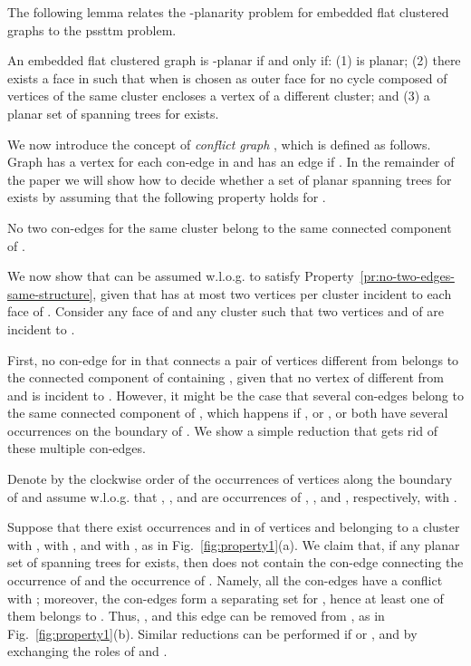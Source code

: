 \documentclass[letter,runningheads]{llncs}
\begin{document}
The following lemma relates the -planarity problem for embedded flat clustered graphs to the {\sc pssttm} problem.

\begin{lemma} \label{le:acyclic-saturator}
An embedded flat clustered graph  is -planar if and only if: (1)  is planar; (2) there exists a face  in  such that when  is chosen as outer face for  no cycle composed of vertices of the same cluster encloses a vertex of a different cluster; and (3) a planar set of spanning trees for  exists.
\end{lemma}

We now introduce the concept of {\em conflict graph} , which is defined as follows. Graph  has a vertex for each con-edge in  and has an edge  if . In the remainder of the paper we will show how to decide whether a set of planar spanning trees for  exists by assuming that the following property holds for .

\begin{prop} \label{pr:no-two-edges-same-structure}
No two con-edges for the same cluster belong to the same connected component of .
\end{prop}

We now show that  can be assumed w.l.o.g. to satisfy Property~\ref{pr:no-two-edges-same-structure}, given that  has at most two vertices per cluster incident to each face of . Consider any face  of  and any cluster  such that two vertices  and  of  are incident to .

First, no con-edge for  in  that connects a pair of vertices different from  belongs to the connected component of  containing , given that no vertex of  different from  and  is incident to . However, it might be the case that several con-edges  belong to the same connected component of , which happens if , or , or both have several occurrences on the boundary of . We show a simple reduction that gets rid of these multiple con-edges.

Denote by  the clockwise order of the occurrences of vertices along the boundary of  and assume w.l.o.g. that , , and  are occurrences of  , , and , respectively, with .

Suppose that there exist occurrences  and  in  of vertices  and  belonging to a cluster  with , with , and with , as in Fig.~\ref{fig:property1}(a). We claim that, if any planar set  of spanning trees for  exists, then  does not contain the con-edge  connecting the occurrence  of  and the occurrence  of . Namely, all the con-edges  have a conflict with ; moreover, the con-edges  form a separating set for , hence at least one of them belongs to . Thus, , and this edge can be removed from , as in Fig.~\ref{fig:property1}(b). Similar reductions can be performed if  or , and by exchanging the roles of  and .
\end{document}
